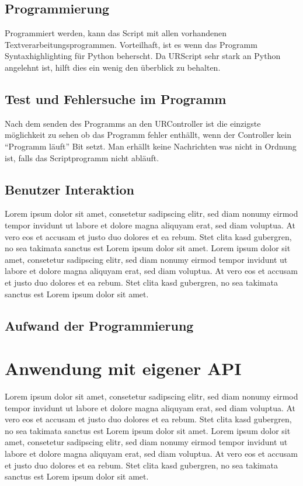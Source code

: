 \subsection{Programmierung}
\label{programmierung_ur_script_rel}

Programmiert werden, kann das Script mit allen vorhandenen Textverarbeitungsprogrammen. Vorteilhaft, ist es wenn das Programm Syntaxhighlighting für Python beherscht. Da URScript sehr stark an Python angelehnt ist, hilft dies ein wenig den überblick zu behalten.

\subsection{Test und Fehlersuche im Programm}
\label{ur_script_debuggen}

Nach dem senden des Programms an den URController ist die einzigste möglichkeit zu sehen ob das Programm fehler enthällt, wenn der Controller kein ``Programm läuft'' Bit setzt. Man erhällt keine Nachrichten was nicht in Ordnung ist, falls das Scriptprogramm nicht abläuft.

\subsection{Benutzer Interaktion}
\label{ur_script_user_interaction}
Lorem ipsum dolor sit amet, consetetur sadipscing elitr, sed diam nonumy eirmod tempor invidunt ut labore et dolore magna aliquyam erat, sed diam voluptua. At vero eos et accusam et justo duo dolores et ea rebum. Stet clita kasd gubergren, no sea takimata sanctus est Lorem ipsum dolor sit amet. Lorem ipsum dolor sit amet, consetetur sadipscing elitr, sed diam nonumy eirmod tempor invidunt ut labore et dolore magna aliquyam erat, sed diam voluptua. At vero eos et accusam et justo duo dolores et ea rebum. Stet clita kasd gubergren, no sea takimata sanctus est Lorem ipsum dolor sit amet.

\subsection{Aufwand der Programmierung}
\label{ur_script_aufwand}

\section{Anwendung mit eigener API}
\label{sec:script_hoerherer_schicht_rel}
Lorem ipsum dolor sit amet, consetetur sadipscing elitr, sed diam nonumy eirmod tempor invidunt ut labore et dolore magna aliquyam erat, sed diam voluptua. At vero eos et accusam et justo duo dolores et ea rebum. Stet clita kasd gubergren, no sea takimata sanctus est Lorem ipsum dolor sit amet. Lorem ipsum dolor sit amet, consetetur sadipscing elitr, sed diam nonumy eirmod tempor invidunt ut labore et dolore magna aliquyam erat, sed diam voluptua. At vero eos et accusam et justo duo dolores et ea rebum. Stet clita kasd gubergren, no sea takimata sanctus est Lorem ipsum dolor sit amet.

